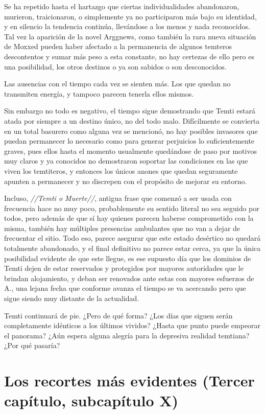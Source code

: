 \documentclass[
  spanish,
]{book}
\begin{document}
Se ha repetido hasta el hartazgo que ciertas individualidades abandonaron, murieron, traicionaron, o simplemente ya no participaron más bajo su identidad, y en silencio la tendencia continúa, llevándose a los menos y nada reconocidos.
Tal vez la aparición de la novel Arggnews, como también la rara nueva situación de Moxxed pueden haber afectado a la permanencia de algunos temteros descontentos y sumar más peso a esta constante, no hay certezas de ello pero es una posibilidad, los otros destinos o ya son sabidos o son desconocidos.

Las ausencias con el tiempo cada vez se sienten más. Los que quedan no transmiten energía, y tampoco parecen tenerla ellos mismos.

Sin embargo no todo es negativo, el tiempo sigue demostrando que Temti estará atada por siempre a un destino único, no del todo malo. Difícilmente se convierta en un total basurero como alguna vez se mencionó, no hay posibles invasores que puedan permanecer lo necesario como para generar perjuicios lo suficientemente graves, pues ellos hasta el momento usualmente quedándose de paso por motivos muy claros y ya conocidos no demostraron soportar las condiciones en las que viven los temtiteros, y entonces los únicos anones que quedan seguramente apunten a permanecer y no discrepen con el propósito de mejorar su entorno.

Incluso, \emph{//Temti o Muerte//}, antigua frase que comenzó a ser usada con frecuencia hace no muy poco, probablemente su sentido literal no sea seguido por todos, pero además de que sí hay quienes parecen haberse comprometido con la misma, también hay múltiples presencias ambulantes que no van a dejar de frecuentar el sitio. Todo eso, parece asegurar que este estado desértico no quedará totalmente abandonado, y el final definitivo no parece estar cerca, ya que la única posibilidad evidente de que este llegue, es ese supuesto día que los dominios de Temti dejen de estar reservados y protegidos por mayores autoridades que le brindan alojamiento, y deban ser renovados ante estas con mayores esfuerzos de A., una lejana fecha que conforme avanza el tiempo se va acercando pero que sigue siendo muy distante de la actualidad.

Temti continuará de pie. ¿Pero de qué forma? ¿Los días que siguen serán completamente idénticos a los últimos vividos? ¿Hasta que punto puede empeorar el panorama? ¿Aún espera alguna alegría para la depresiva realidad temtiana? ¿Por qué pasaría?

\hypertarget{los-recortes-muxe1s-evidentes-tercer-capuxedtulo-subcapuxedtulo-x}{%
\section{Los recortes más evidentes (Tercer capítulo, subcapítulo X)}\label{los-recortes-muxe1s-evidentes-tercer-capuxedtulo-subcapuxedtulo-x}}
\end{document}
